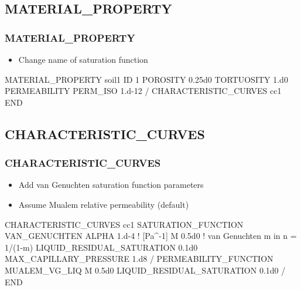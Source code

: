 \documentclass{beamer}
\newcommand\bluecomment[1]{{{\color{blue} #1}}}
\newcommand\magentacomment[1]{{{\color{magenta} #1}}}
\begin{document}
\subsection{MATERIAL\_PROPERTY}

\begin{frame}[fragile]\frametitle{MATERIAL\_PROPERTY}

\begin{itemize}
\item Change name of saturation function
\end{itemize}

\begin{semiverbatim}
MATERIAL_PROPERTY soil1
  ID 1
  POROSITY 0.25d0
  TORTUOSITY 1.d0
  PERMEABILITY
    PERM_ISO 1.d-12
  /
  CHARACTERISTIC\_CURVES \magentacomment{cc1}
END
\end{semiverbatim}

\end{frame}

\subsection{CHARACTERISTIC\_CURVES}

\begin{frame}[fragile]\frametitle{CHARACTERISTIC\_CURVES}

\begin{itemize}
\item Add van Genuchten saturation function parameters
\item Assume Mualem relative permeability (default)
\end{itemize}

\begin{semiverbatim}
CHARACTERISTIC_CURVES \magentacomment{cc1
  SATURATION_FUNCTION VAN_GENUCHTEN
    ALPHA  1.d-4}    \bluecomment{! [Pa^-1]}
    \magentacomment{M 0.5d0}         \bluecomment{! van Genuchten m in n = 1/(1-m)}
    \magentacomment{LIQUID_RESIDUAL_SATURATION 0.1d0
    MAX_CAPILLARY_PRESSURE 1.d8
  /
  PERMEABILITY_FUNCTION MUALEM_VG_LIQ
    M 0.5d0
    LIQUID_RESIDUAL_SATURATION 0.1d0
  /}
END
\end{semiverbatim}

\end{frame}

\end{document}
